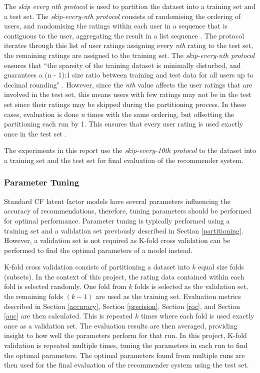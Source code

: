 The \textit{skip every nth protocol} \cite{zhang} is used to partition the dataset into a training set and a test set. The \textit{skip-every-nth protocol} consists of randomising the ordering of users, and randomising the ratings within each user in a sequence that is contiguous to the user, aggregating the result in a list sequence \cite{zhang}. The protocol iterates through this list of user ratings assigning every \textit{nth} rating to the test set, the remaining ratings are assigned to the training set. The \textit{skip-every-nth protocol} ensures that ``the sparsity of the training dataset is minimally disturbed, and guarantees a (n - 1):1 size ratio between training and test data for all users up to decimal rounding" \cite{zhang}. However, since the \textit{nth} value affects the user ratings that are involved in the test set, this means users with few ratings may not be in the test set since their ratings may be skipped during the partitioning process. In these cases, evaluation is done \textit{n} times with the same ordering, but offsetting the partitioning each run by 1. This ensures that every user rating is used exactly once in the test set \cite{zhang}. 

The experiments in this report use the \textit{skip-every-10th protocol} to the dataset into a training set and the test set for final evaluation of the recommender system.

\subsubsection{Parameter Tuning}

Standard CF latent factor models have several parameters influencing the accuracy of recommendations, therefore, tuning parameters should be performed for optimal performance. Parameter tuning is typically performed using a training set and a validation set previously described in Section \ref{partitioning}. However, a validation set is not required as K-fold cross validation can be performed to find the optimal parameters of a model instead. 

K-fold cross validation \cite{kfold, campochiaro2009metrics} consists of partitioning a dataset into $k$ equal size folds (subsets). In the context of this project, the rating data contained within each fold is selected randomly. One fold from $k$ folds is selected as the validation set, the remaining folds $(k-1)$ are used as the training set. Evaluation metrics described in Section \ref{accuracy}, Section \ref{precision}, Section \ref{roc}, and Section \ref{auc} are then calculated. This is repeated $k$ times where each fold is used exactly once as a validation set. The evaluation results are then averaged, providing insight to how well the parameters perform for that run. In this project, K-fold validation is repeated multiple times, tuning the parameters in each run to find the optimal parameters. The optimal parameters found from multiple runs are then used for the final evaluation of the recommender system using the test set.

